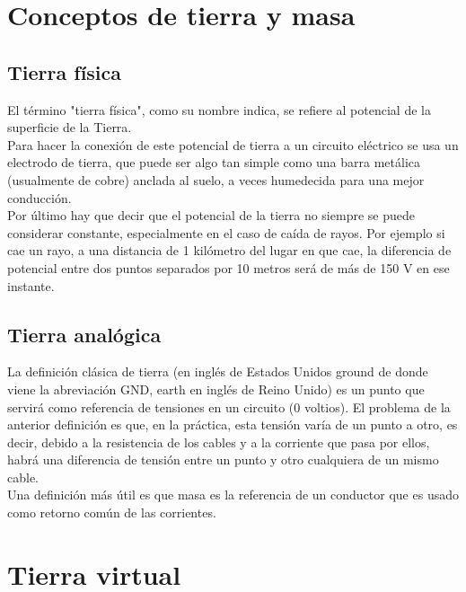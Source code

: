\documentclass{article}
\begin{document}
\section{Conceptos de tierra y masa}

\subsection{Tierra física}

El término "tierra física", como su nombre indica, se refiere al potencial de la superficie de la Tierra.\citep{TT}\\

 Para hacer la conexión de este potencial de tierra a un circuito eléctrico se usa un electrodo de tierra, que puede ser algo tan simple como una barra metálica (usualmente de cobre) anclada al suelo, a veces humedecida para una mejor conducción.\citep{TT}\\

Por último hay que decir que el potencial de la tierra no siempre se puede considerar constante, especialmente en el caso de caída de rayos. Por ejemplo si cae un rayo, a una distancia de 1 kilómetro del lugar en que cae, la diferencia de potencial entre dos puntos separados por 10 metros será de más de 150 V en ese instante.\citep{TT}\\

\subsection{Tierra analógica}

La definición clásica de tierra (en inglés de Estados Unidos ground de donde viene la abreviación GND, earth en inglés de Reino Unido) es un punto que servirá como referencia de tensiones en un circuito (0 voltios). El problema de la anterior definición es que, en la práctica, esta tensión varía de un punto a otro, es decir, debido a la resistencia de los cables y a la corriente que pasa por ellos, habrá una diferencia de tensión entre un punto y otro cualquiera de un mismo cable.\citep{TT}\\

Una definición más útil es que masa es la referencia de un conductor que es usado como retorno común de las corrientes.\citep{TT}\\

\section{Tierra virtual}
\end{document}
